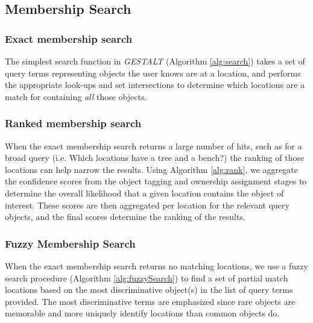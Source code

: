 \subsection{Membership Search}

\subsubsection{\textbf{Exact membership search}}
The simplest search function in \emph{GESTALT} (Algorithm \ref{alg:search}) takes a set of query terms representing objects the user knows are at a location, and performs the appropriate look-ups and set intersections to determine which locations are a match for containing \textit{all} those objects.

\subsubsection{\textbf{Ranked membership search}}
When the exact membership search returns a large number of hits, such as for a broad query (i.e. Which locations have a tree and a bench?) the ranking of those locations can help narrow the results. Using Algorithm \ref{alg:rank}, we aggregate the confidence scores from the object tagging and ownership assignment stages to determine the overall likelihood that a given location contains the object of interest. These scores are then aggregated per location for the relevant query objects, and the final scores determine the ranking of the results. 

\subsubsection{\textbf{Fuzzy Membership Search}}
When the exact membership search returns no matching locations, we use a fuzzy search procedure (Algorithm \ref{alg:fuzzySearch}) to find a set of partial match locations based on the most discriminative object(s) in the list of query terms provided. 
The most discriminative terms are emphasized since rare objects are memorable and more uniquely identify locations than common objects do.




